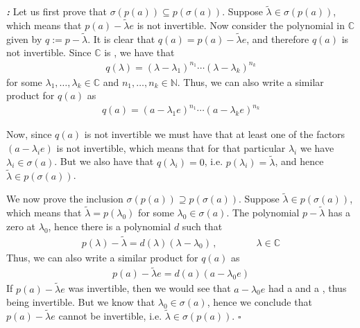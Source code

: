 \documentclass[12pt]{article}
\begin{document}
{\bf \emph{:}} Let us first prove that $\sigma(p(a)) \subseteq p(\sigma(a))$. Suppose $\widetilde{\lambda} \in \sigma(p(a))$, which means that $p(a) - \widetilde{\lambda} e$ is not invertible. Now consider the polynomial in $\mathbb{C}$ given by $q:= p - \widetilde{\lambda}$. It is clear that $q(a) = p(a) - \widetilde{\lambda} e$, and therefore $q(a)$ is not invertible. Since $\mathbb{C}$ is , we have that
\begin{align*}
q(\lambda) = (\lambda - \lambda_1)^{n_1} \cdots (\lambda - \lambda_k)^{n_k}
\end{align*}
for some $\lambda_1, \dots, \lambda_k \in \mathbb{C}$ and $n_1, \dots, n_k \in \mathbb{N}$. Thus, we can also write a similar product for $q(a)$ as
\begin{align*}
q(a) = (a - \lambda_1e)^{n_1} \cdots (a - \lambda_k e)^{n_k}
\end{align*}

Now, since $q(a)$ is not invertible we must have that at least one of the factors $(a-\lambda_i e)$ is not invertible, which means that for that particular $\lambda_i$ we have $\lambda_i \in \sigma(a)$. But we also have that $q(\lambda_i) = 0$, i.e. $p(\lambda_i) = \widetilde{\lambda}$, and hence $\widetilde{\lambda} \in p(\sigma(a))$.

We now prove the  inclusion $\sigma(p(a)) \supseteq p(\sigma(a))$. Suppose $\widetilde{\lambda} \in p(\sigma(a))$, which means that $\widetilde{\lambda} = p(\lambda_0)$ for some $\lambda_0 \in \sigma(a)$. The polynomial $p - \widetilde{\lambda}$ has a zero at $\lambda_0$, hence there is a polynomial $d$ such that
\begin{align*}
p(\lambda) - \widetilde{\lambda}= d(\lambda) (\lambda - \lambda_0)\,, \qquad\qquad \lambda \in \mathbb{C}
\end{align*}
Thus, we can also write a similar product for $q(a)$ as
\begin{align*}
p(a) - \widetilde{\lambda} e = d(a) (a - \lambda_0 e)
\end{align*}
If $p(a) - \widetilde{\lambda} e$ was invertible, then we would see that $a - \lambda_0 e$ had a  and a , thus being invertible. But we know that $\lambda_0 \in \sigma(a)$, hence we conclude that $p(a) - \widetilde{\lambda} e$ cannot be invertible, i.e. $\widetilde{\lambda} \in \sigma(p(a))$. $\square$
\end{document}
